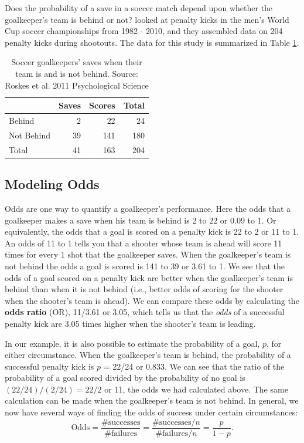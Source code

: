 \documentclass[
]{krantz}
\begin{document}
Does the probability of a save in a soccer match depend upon whether the goalkeeper's team is behind or not? \citet{Roskes2011} looked at penalty kicks in the men's World Cup soccer championships from 1982 - 2010, and they assembled data on 204 penalty kicks during shootouts. The data for this study is summarized in Table \ref{tab:table1chp6}.

\begin{table}[t]

\caption{\label{tab:table1chp6}Soccer goalkeepers' saves when their team is and is not behind.  Source: Roskes et al. 2011 Psychological Science}
\centering
\begin{tabular}{lrrr}
\toprule
  & Saves & Scores & Total\\
\midrule
Behind & 2 & 22 & 24\\
Not Behind & 39 & 141 & 180\\
Total & 41 & 163 & 204\\
\bottomrule
\end{tabular}
\end{table}

\hypertarget{modeling-odds}{%
\subsection{Modeling Odds}\label{modeling-odds}}

Odds are one way to quantify a goalkeeper's performance. Here the odds that a goalkeeper makes a save when his team is behind is 2 to 22 or 0.09 to 1. Or equivalently, the odds that a goal is scored on a penalty kick is 22 to 2 or 11 to 1. An odds of 11 to 1 tells you that a shooter whose team is ahead will score 11 times for every 1 shot that the goalkeeper saves. When the goalkeeper's team is not behind the odds a goal is scored is 141 to 39 or 3.61 to 1. We see that the odds of a goal scored on a penalty kick are better when the goalkeeper's team is behind than when it is not behind (i.e., better odds of scoring for the shooter when the shooter's team is ahead). We can compare these odds by calculating the \textbf{odds ratio}  (OR), 11/3.61 or 3.05, which tells us that the \emph{odds} of a successful penalty kick are 3.05 times higher when the shooter's team is leading.

In our example, it is also possible to estimate the probability of a goal, \(p\), for either circumstance. When the goalkeeper's team is behind, the probability of a successful penalty kick is \(p\) = 22/24 or 0.833. We can see that the ratio of the probability of a goal scored divided by the probability of no goal is \((22/24)/(2/24)=22/2\) or 11, the odds we had calculated above. The same calculation can be made when the goalkeeper's team is not behind. In general, we now have several ways of finding the odds of success under certain circumstances:
\[\textrm{Odds} = \frac{\# \textrm{successes}}{\# \textrm{failures}}=
\frac{\# \textrm{successes}/n}{\# \textrm{failures}/n}=
\frac{p}{1-p}.\]
\end{document}
